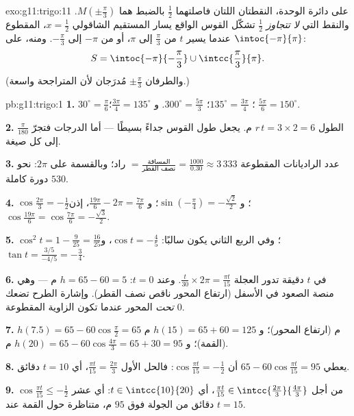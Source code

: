 \begin{solution}{exo:g11:trigo:11}
على دائرة الوحدة، النقطتان اللتان فاصلتهما $\frac12$ بالضبط هما
$M\!\left(\pm\frac\pi3\right)$. والنقط التي  \emph{لا تتجاوز}
$\frac12$ تشكّل القوس الواقع يسار المستقيم الشاقولي $x = \frac12$،
المقطوع عندما يسير $t$ من $\frac\pi3$ إلى $\pi$، أو من $-\pi$ إلى
$-\frac\pi3$. ومنه، على $\intoc{-\pi}{\pi}$:
\[
S = \intoc{-\pi}{-\frac{\pi}{3}} \cup \intcc{\frac{\pi}{3}}{\pi}.
\]
(والطرفان $\pm\frac\pi3$ مُدرَجان لأن المتراجحة واسعة.)
\end{solution}

\begin{solution}{pb:g11:trigo:1}
\textbf{1.} $30^\circ = \frac{\pi}{6}$؛ $135^\circ =
\frac{3\pi}{4}$؛ $300^\circ = \frac{5\pi}{3}$. و
$\frac{3\pi}{4} = 135^\circ$؛ $\frac{5\pi}{6} = 150^\circ$.

\textbf{2.} الطول $r\,t = 3 \times 2 = 6$ م.  يجعل طول
القوس جداءً بسيطًا --- أما الدرجات فتجرّ
$\frac{\pi}{180}$ إلى كل صيغة.

\textbf{3.} عدد الراديانات المقطوعة $= \frac{\text{المسافة}}
{\text{نصف القطر}} = \frac{1000}{0.30} \approx 3\,333$ راد؛
وبالقسمة على $2\pi$: نحو $530$ دورة كاملة.

\textbf{4.} $\cos\frac{2\pi}{3} = -\frac12$؛
و $\sin\left(-\frac\pi4\right) = -\frac{\sqrt2}{2}$؛
و $\frac{19\pi}{6} - 2\pi = \frac{7\pi}{6}$، إذن
$\cos\frac{19\pi}{6} = \cos\frac{7\pi}{6} =
-\frac{\sqrt3}{2}$.

\textbf{5.} $\cos^2 t = 1 - \frac{9}{25} = \frac{16}{25}$؛ وفي
الربع الثاني يكون  سالبًا:
$\cos t = -\frac45$، و
$\tan t = \frac{3/5}{-4/5} = -\frac34$.

\textbf{6.} في $t$ دقيقة تدور العجلة
$\frac{t}{30} \times 2\pi = \frac{\pi t}{15}$. وعند $t = 0$:
$h = 65 - 60 = 5$ م --- وهي منصة الصعود في الأسفل
(ارتفاع المحور ناقص نصف القطر). وإشارة الطرح تضعك \emph{تحت}
المحور عندما تكون الزاوية المقطوعة $0$.

\textbf{7.} $h(7.5) = 65 - 60\cos\frac{\pi}{2} = 65$ م (ارتفاع
المحور)؛ و $h(15) = 65 + 60 = 125$ م (القمة)؛
و $h(20) = 65 - 60\cos\frac{4\pi}{3} = 65 + 30 = 95$ م.

\textbf{8.} يعطي $65 - 60\cos\frac{\pi t}{15} = 95$ أن
$\cos\frac{\pi t}{15} = -\frac12$: فالحل الأول
$\frac{\pi t}{15} = \frac{2\pi}{3}$، أي $t = 10$ دقائق.

\textbf{9.} $\cos\frac{\pi t}{15} \leq -\frac12$ من أجل
$\frac{\pi t}{15} \in \intcc{\frac{2\pi}{3}}{\frac{4\pi}{3}}$،
أي $t \in \intcc{10}{20}$: أي عشر دقائق من الجولة فوق
$95$ م، متناظرة حول القمة عند $t = 15$.


\end{solution}
